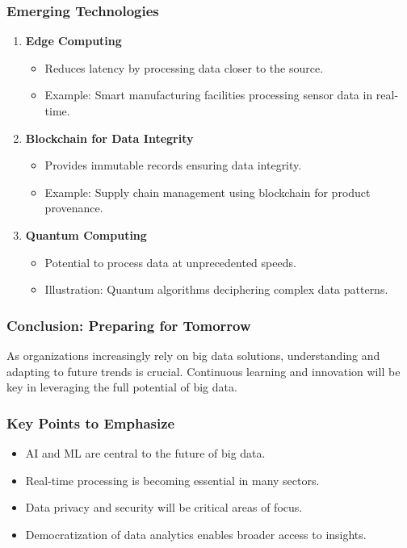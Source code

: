 \documentclass[aspectratio=169]{beamer}
\begin{document}
\begin{frame}[fragile]
    \frametitle{Emerging Technologies}
    \begin{enumerate}
        \item \textbf{Edge Computing}
        \begin{itemize}
            \item Reduces latency by processing data closer to the source.
            \item Example: Smart manufacturing facilities processing sensor data in real-time.
        \end{itemize}

        \item \textbf{Blockchain for Data Integrity}
        \begin{itemize}
            \item Provides immutable records ensuring data integrity.
            \item Example: Supply chain management using blockchain for product provenance.
        \end{itemize}

        \item \textbf{Quantum Computing}
        \begin{itemize}
            \item Potential to process data at unprecedented speeds.
            \item Illustration: Quantum algorithms deciphering complex data patterns.
        \end{itemize}
    \end{enumerate}
\end{frame}

\begin{frame}[fragile]
    \frametitle{Conclusion: Preparing for Tomorrow}
    As organizations increasingly rely on big data solutions, understanding and adapting to future trends is crucial. Continuous learning and innovation will be key in leveraging the full potential of big data.
\end{frame}

\begin{frame}[fragile]
    \frametitle{Key Points to Emphasize}
    \begin{itemize}
        \item AI and ML are central to the future of big data.
        \item Real-time processing is becoming essential in many sectors.
        \item Data privacy and security will be critical areas of focus.
        \item Democratization of data analytics enables broader access to insights.
    \end{itemize}
\end{frame}
\end{document}
